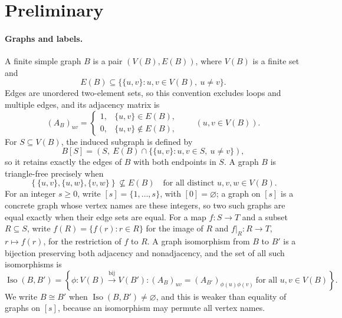 \documentclass[11pt]{article}
\begin{document}
\section{Preliminary}\label{sec:preliminary}
\paragraph{Graphs and labels.}
A finite simple graph $B$ is a pair $(V(B),E(B))$, where $V(B)$ is a finite set and
\[
E(B)\subseteq\{\{u,v\}:u,v\in V(B),\ u\ne v\}.
\]
Edges are unordered two-element sets, so this convention excludes loops and multiple edges, and its adjacency matrix is
\[
(A_B)_{uv}=\begin{cases}1,&\{u,v\}\in E(B),\\0,&\{u,v\}\notin E(B),\end{cases}
\qquad (u,v\in V(B)).
\]
For $S\subseteq V(B)$, the induced subgraph is defined by
\[
B[S]=\left(S,\ E(B)\cap\{\{u,v\}:u,v\in S,\ u\ne v\}\right),
\]
so it retains exactly the edges of $B$ with both endpoints in $S$.
A graph $B$ is triangle-free precisely when
\[
\left\{\{u,v\},\{u,w\},\{v,w\}\right\}\nsubseteq E(B)
\quad\text{for all distinct }u,v,w\in V(B).
\]
For an integer $s\geq0$, write $[s]=\{1,\ldots,s\}$, with $[0]=\varnothing$; a graph on $[s]$ is a concrete graph whose vertex names are these integers, so two such graphs are equal exactly when their edge sets are equal.
For a map $f:S\to T$ and a subset $R\subseteq S$, write
$f(R)=\{f(r):r\in R\}$ for the image of $R$ and
$f|_R:R\to T$, $r\mapsto f(r)$, for the restriction of $f$ to $R$.
A graph isomorphism from $B$ to $B'$ is a bijection preserving both adjacency and nonadjacency, and the set of all such isomorphisms is
\begin{equation}\label{eq:isomorphisms}
\operatorname{Iso}(B,B')=
\left\{\phi:V(B)\overset{\mathrm{bij}}{\longrightarrow}V(B'):
(A_B)_{uv}=(A_{B'})_{\phi(u)\phi(v)}
\ \text{for all }u,v\in V(B)\right\}.
\end{equation}
We write $B\cong B'$ when $\operatorname{Iso}(B,B')\ne\varnothing$, and this is weaker than equality of graphs on $[s]$, because an isomorphism may permute all vertex names.
\end{document}
